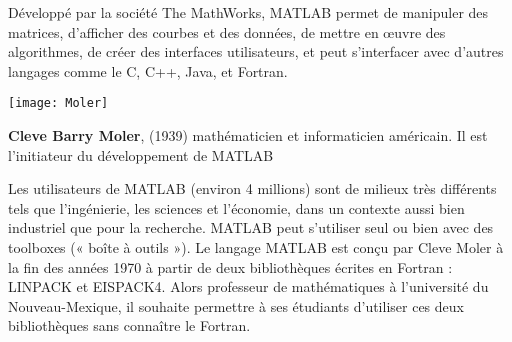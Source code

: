 Développé par la société The MathWorks, MATLAB permet de manipuler des matrices,
d'afficher des courbes et des données, de mettre en œuvre des algorithmes, 
de créer des interfaces utilisateurs, et peut s’interfacer avec d’autres 
langages comme le C, C++, Java, et Fortran.
\begin{marginfigure}
    \centering
    \texttt{[image: Moler]}
    \caption*{\textbf{Cleve Barry Moler}, (1939) 
              mathématicien et informaticien américain. Il est l'initiateur 
              du développement de MATLAB}
\end{marginfigure}
Les utilisateurs de MATLAB (environ 4 millions) sont de milieux très différents 
tels que l’ingénierie, les sciences et l’économie, dans un contexte aussi 
bien industriel que pour la recherche.
MATLAB peut s'utiliser seul ou bien avec des toolboxes (« boîte à outils »).
Le langage MATLAB est conçu par Cleve Moler à la fin des années 1970 à partir 
de deux bibliothèques écrites en Fortran : LINPACK et EISPACK4.
Alors professeur de mathématiques à l'université du Nouveau-Mexique, 
il souhaite permettre à ses étudiants d'utiliser ces deux bibliothèques sans 
connaître le Fortran. 
